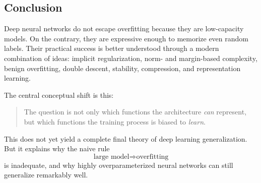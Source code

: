 \subsection{Conclusion}

Deep neural networks do not escape overfitting because they are low-capacity models. On the contrary, they are expressive enough to memorize even random labels. Their practical success is better understood through a modern combination of ideas: implicit regularization, norm- and margin-based complexity, benign overfitting, double descent, stability, compression, and representation learning.

The central conceptual shift is this:

\begin{quote}
The question is not only which functions the architecture \emph{can} represent, but which functions the training process is biased to \emph{learn}.
\end{quote}

This does not yet yield a complete final theory of deep learning generalization. But it explains why the naive rule
\[
\text{large model} \Rightarrow \text{overfitting}
\]
is inadequate, and why highly overparameterized neural networks can still generalize remarkably well.